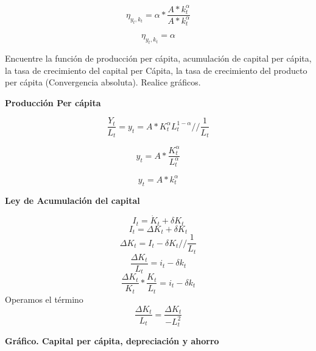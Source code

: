 \documentclass{oxmathproblems}
\begin{document}
\begin{questions}
\begin{parts}
\begin{subparts}
    $$\eta_{y_t,k_t} =  \alpha * \dfrac{A*k_t^{\alpha}}{A*k_t^{\alpha}}$$
    
    $$\eta_{y_t,k_t} =  \alpha$$
    
\subpart    
    Encuentre la función de producción per cápita, acumulación de capital per cápita, la tasa de crecimiento del capital per Cápita, la tasa de crecimiento del producto per cápita (Convergencia absoluta). Realice gráficos.
    
    \textbf{Producción Per cápita}
    
     $$\dfrac{Y_t}{L_t} = y_t = A*K_t^\alpha L_t^{1-\alpha} // \dfrac{1}{L_t}$$
    
    $$y_t = A*\dfrac{K_t^\alpha}{L_t^{\alpha}}$$
    
    $$y_t = A*k_t^\alpha$$
    
    \textbf{Ley de Acumulación del capital}
    
    \[{I_t} = {{\dot K}_t} + \delta {K_t}\] 
    $${I_t} = \Delta K_t + \delta {K_t}$$
    $$\Delta K_t = {I_t} - \delta {K_t} // \dfrac{1}{L_t}$$ 
    $$\dfrac{\Delta K_t}{L_t} = i_t - \delta {k_t}$$
    $$\dfrac{\Delta K_t}{K_t}*\dfrac{K_t}{L_t} = i_t - \delta {k_t}$$
    Operamos el término
    $$\dfrac{\Delta K_t}{L_t} = \dfrac{\Delta K_t}{-L_t^2}$$
    \medskip
    
    \begin{center}
        \textbf{Gráfico. Capital per cápita, depreciación y ahorro}
    \end{center}

  \end{subparts}
\end{parts}


\begin{solution}
  
\end{solution}


\miquestion
\begin{parts}

\end{parts}
\end{questions}
\end{document}
